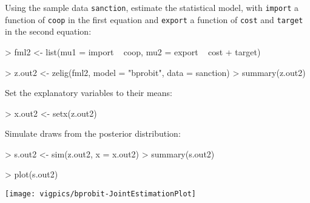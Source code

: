 \documentclass{article}
\begin{document}
\begin{enumerate}
Using the sample data \texttt{sanction}, estimate the statistical model, 
with {\tt import} a function of {\tt coop} in the first equation and 
{\tt export} a function of {\tt cost} and {\tt target} in the second equation:
\begin{Schunk}
\begin{Sinput}
> fml2 <- list(mu1 = import ~ coop, mu2 = export ~ cost + target)
\end{Sinput}
\end{Schunk}
\begin{Schunk}
\begin{Sinput}
> z.out2 <- zelig(fml2, model = "bprobit", data = sanction)
> summary(z.out2)
\end{Sinput}
\end{Schunk}
Set the explanatory variables to their means:
\begin{Schunk}
\begin{Sinput}
> x.out2 <- setx(z.out2)
\end{Sinput}
\end{Schunk}
Simulate draws from the posterior distribution:
\begin{Schunk}
\begin{Sinput}
> s.out2 <- sim(z.out2, x = x.out2)
> summary(s.out2)
\end{Sinput}
\end{Schunk}
\begin{center}
\begin{Schunk}
\begin{Sinput}
> plot(s.out2)
\end{Sinput}
\end{Schunk}
\texttt{[image: vigpics/bprobit-JointEstimationPlot]}
\end{center}


%   
% 

\end{enumerate}
\end{document}
